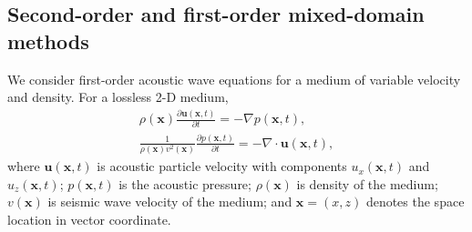 \subsection{Second-order and first-order mixed-domain methods}


We consider first-order acoustic wave equations for a medium of variable velocity and density. For a lossless 2-D medium,
\begin{equation}
\begin{array}{l}
\label{eq:fowq}
\displaystyle \rho(\mathbf{x})\frac{\partial\mathbf{u}(\mathbf{x},t)}{\partial t} = -\nabla p(\mathbf{x},t), \\
\displaystyle \frac{1}{\rho(\mathbf{x})v^2(\mathbf{x})} \frac{\partial p(\mathbf{x},t)}{\partial t} = -\nabla \cdot \mathbf{u}(\mathbf{x},t),
\end{array}
\end{equation}
where $\mathbf{u}(\mathbf{x},t)$ is acoustic particle velocity with components $u_x(\mathbf{x},t)$ and $u_z(\mathbf{x},t)$; $p(\mathbf{x},t)$ is the acoustic pressure; $\rho(\mathbf{x})$ is density of the medium; $v(\mathbf{x})$ is seismic wave velocity of the medium; and $\mathbf{x}=(x,z)$ denotes the space location in vector coordinate.

